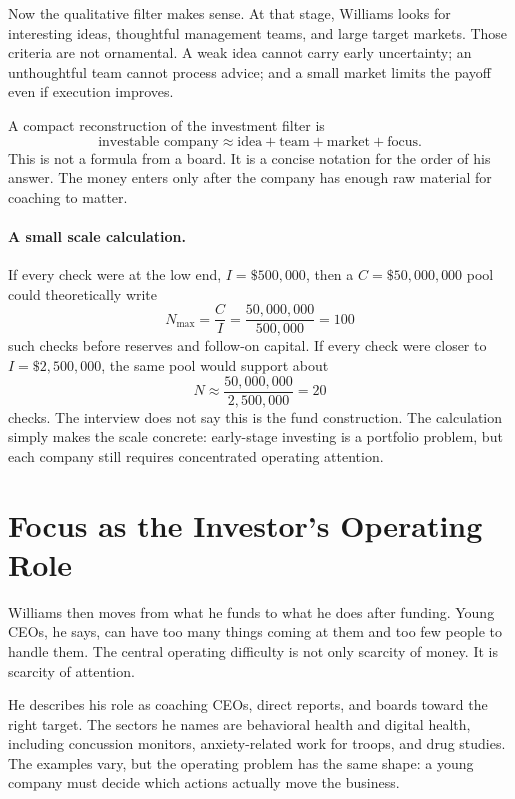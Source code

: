 Now the qualitative filter makes sense. At that stage, Williams looks for interesting ideas, thoughtful management teams, and large target markets. Those criteria are not ornamental. A weak idea cannot carry early uncertainty; an unthoughtful team cannot process advice; and a small market limits the payoff even if execution improves.

A compact reconstruction of the investment filter is
\begin{equation}
\text{investable company}
\approx
\text{idea}
+
\text{team}
+
\text{market}
+
\text{focus}.
\end{equation}
This is not a formula from a board. It is a concise notation for the order of his answer. The money enters only after the company has enough raw material for coaching to matter.

\paragraph{A small scale calculation.}
If every check were at the low end, \(I=\$500{,}000\), then a \(C=\$50{,}000{,}000\) pool could theoretically write
\begin{equation}
N_{\max}=\frac{C}{I}
=
\frac{50{,}000{,}000}{500{,}000}
=
100
\end{equation}
such checks before reserves and follow-on capital. If every check were closer to \(I=\$2{,}500{,}000\), the same pool would support about
\begin{equation}
N \approx \frac{50{,}000{,}000}{2{,}500{,}000}=20
\end{equation}
checks. The interview does not say this is the fund construction. The calculation simply makes the scale concrete: early-stage investing is a portfolio problem, but each company still requires concentrated operating attention.

\section{Focus as the Investor's Operating Role}

Williams then moves from what he funds to what he does after funding. Young CEOs, he says, can have too many things coming at them and too few people to handle them. The central operating difficulty is not only scarcity of money. It is scarcity of attention.

He describes his role as coaching CEOs, direct reports, and boards toward the right target. The sectors he names are behavioral health and digital health, including concussion monitors, anxiety-related work for troops, and drug studies. The examples vary, but the operating problem has the same shape: a young company must decide which actions actually move the business.

